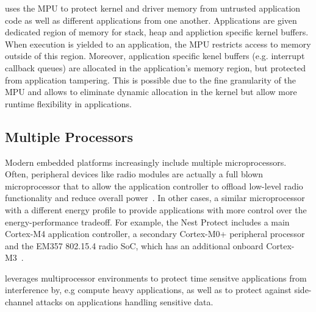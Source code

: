 \name uses the MPU to protect kernel and driver memory from untrusted
application code as well as different applications from one another.
Applications are given dedicated region of memory for stack, heap and appliction
specific kernel buffers. When execution is yielded to an application, the MPU
restricts access to memory outside of this region. Moreover, application
specific kenel buffers (e.g. interrupt callback queues) are allocated in the
application's memory region, but protected from application tampering. This is
possible due to the fine granularity of the MPU and allows \name to eliminate
dynamic allocation in the kernel but allow more runtime flexibility in
applications.

\subsection{Multiple Processors}

Modern embedded platforms increasingly include multiple microprocessors. Often,
peripheral devices like radio modules are actually a full blown microprocessor
that to allow the application controller to offload low-level radio
functionality and reduce overall power~\cite{nrf51822,cc2540}. In other cases, a
similar microprocessor with a different energy profile to provide applications
with more control over the energy-performance tradeoff.  For example, the Nest
Protect includes a main Cortex-M4 application controller, a secondary Cortex-M0+
peripheral processor and the EM357 802.15.4 radio SoC, which has an additional
onboard Cortex-M3~\cite{nestprotect-teardown}.

\name leverages multiprocessor environments to protect time sensitve
applications from interference by, e.g compute heavy applications, as well as to
protect against side-channel attacks on applications handling sensitive data.

